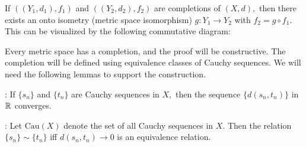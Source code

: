 \begin{prop}
If $((Y_1, d_1), f_1)$ and $((Y_2,d_2),f_2)$ are completions of $(X,d),$ then there exists an onto isometry (metric space isomorphism) $g:Y_1\rightarrow Y_2$ with $f_2=g\circ f_1.$ This can be visualized by the following commutative diagram: \\
\begin{center}
\end{center}
\end{prop}

\noindent Every metric space has a completion, and the proof will be constructive. The completion will be defined using equivalence classes of Cauchy sequences. We will need the following lemmas to support the construction.

\begin{frame*}
\noindent {}: If $\{s_n\}$ and $\{t_n\}$ are Cauchy sequences in $X,$ then the sequence $\{d(s_n,t_n)\}$ in $\mathbb{R}^{}$ converges. \\
\end{frame*}

\begin{frame*}
\noindent {}: Let $\text{Cau}(X)$ denote the set of all Cauchy sequences in $X.$ Then the relation $\{s_n\}\sim \{t_n\}$ iff $d(s_n,t_n)\rightarrow 0$ is an equivalence relation. \\ \\
\end{frame*}

